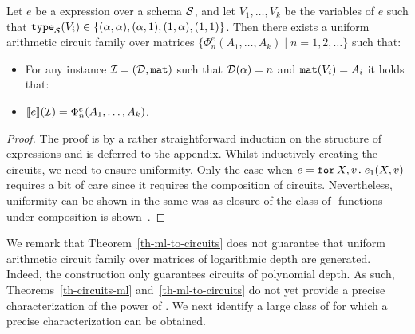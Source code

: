 
\begin{theorem}
\label{th-ml-to-circuits}
Let $e$ be a \langfor expression over a schema $\mathcal{S}$, and let $V_1,\ldots ,V_k$ be the variables of $e$ such that $\texttt{type}_{\mathcal{S}}(V_i)\in \{(\alpha,\alpha), (\alpha,1), (1,\alpha), (1,1)\}$. Then there exists a uniform arithmetic circuit family over matrices $\{\Phi_n^e(A_1,\ldots ,A_k)\mid n=1,2,\ldots\}$ such that:
\begin{itemize}
\item For any instance $\mathcal{I} = (\mathcal{D},\texttt{mat})$ such that $\mathcal{D}(\alpha) = n$ and $\texttt{mat}(V_i) = A_i$ it holds that:
\item $\llbracket e \rrbracket(\mathcal{I}) = \Phi_n^e(A_1,\ldots ,A_k)$.
\end{itemize}
\end{theorem}
\begin{proof}
The proof is by a rather straightforward induction on the structure of \langfor expressions and is deferred to the appendix. Whilst inductively 
creating the circuits, we need to ensure uniformity. Only the case when $e=\texttt{for}\, X,v \texttt{.}\, e_1(X, v)$ requires a bit of care since it requires the
composition of circuits. Nevertheless, uniformity can be shown in the same was as closure of the class of \logspace-functions under composition is shown~\cite{aroraB2009}.
\end{proof}

We remark that Theorem~\ref{th-ml-to-circuits} does not guarantee that uniform arithmetic circuit family over matrices of logarithmic depth are generated. Indeed, the construction
only guarantees circuits of polynomial depth. As such, Theorems~\ref{th-circuits-ml} and~\ref{th-ml-to-circuits} do not yet provide a precise characterization 
of the power of \langfor. We next identify a large class of \langfor for which a precise characterization can be obtained.



